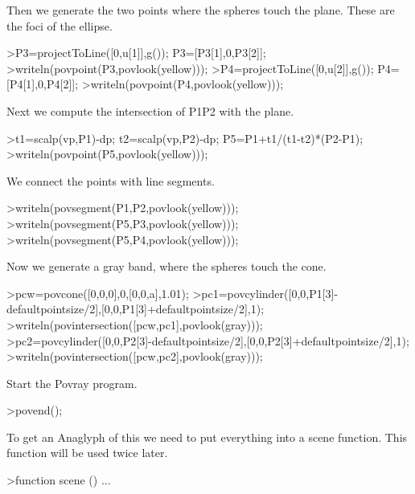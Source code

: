 \documentclass{article}
\begin{document}
\begin{eulernotebook}
\begin{eulercomment}
\begin{eulercomment}
\begin{eulercomment}
\begin{eulercomment}
\begin{eulercomment}
\begin{eulercomment}
\begin{eulercomment}
\begin{eulercomment}
\begin{eulercomment}
Then we generate the two points where the spheres touch the plane.
These are the foci of the ellipse.
\end{eulercomment}
\begin{eulerprompt}
>P3=projectToLine([0,u[1]],g()); P3=[P3[1],0,P3[2]];
>writeln(povpoint(P3,povlook(yellow)));
>P4=projectToLine([0,u[2]],g()); P4=[P4[1],0,P4[2]];
>writeln(povpoint(P4,povlook(yellow)));
\end{eulerprompt}
\begin{eulercomment}
Next we compute the intersection of P1P2 with the plane.
\end{eulercomment}
\begin{eulerprompt}
>t1=scalp(vp,P1)-dp; t2=scalp(vp,P2)-dp; P5=P1+t1/(t1-t2)*(P2-P1);
>writeln(povpoint(P5,povlook(yellow)));
\end{eulerprompt}
\begin{eulercomment}
We connect the points with line segments.
\end{eulercomment}
\begin{eulerprompt}
>writeln(povsegment(P1,P2,povlook(yellow)));
>writeln(povsegment(P5,P3,povlook(yellow)));
>writeln(povsegment(P5,P4,povlook(yellow)));
\end{eulerprompt}
\begin{eulercomment}
Now we generate a gray band, where the spheres touch the cone.
\end{eulercomment}
\begin{eulerprompt}
>pcw=povcone([0,0,0],0,[0,0,a],1.01);
>pc1=povcylinder([0,0,P1[3]-defaultpointsize/2],[0,0,P1[3]+defaultpointsize/2],1);
>writeln(povintersection([pcw,pc1],povlook(gray)));
>pc2=povcylinder([0,0,P2[3]-defaultpointsize/2],[0,0,P2[3]+defaultpointsize/2],1);
>writeln(povintersection([pcw,pc2],povlook(gray)));
\end{eulerprompt}
\begin{eulercomment}
Start the Povray program.
\end{eulercomment}
\begin{eulerprompt}
>povend();
\end{eulerprompt}
\begin{eulercomment}
To get an Anaglyph of this we need to put everything into a scene
function. This function will be used twice later.
\end{eulercomment}
\begin{eulerprompt}
>function scene () ...
\end{eulerprompt}

\end{eulercomment}
\end{eulercomment}
\end{eulercomment}
\end{eulercomment}
\end{eulercomment}
\end{eulercomment}
\end{eulercomment}
\end{eulercomment}
\end{eulernotebook}
\end{document}
